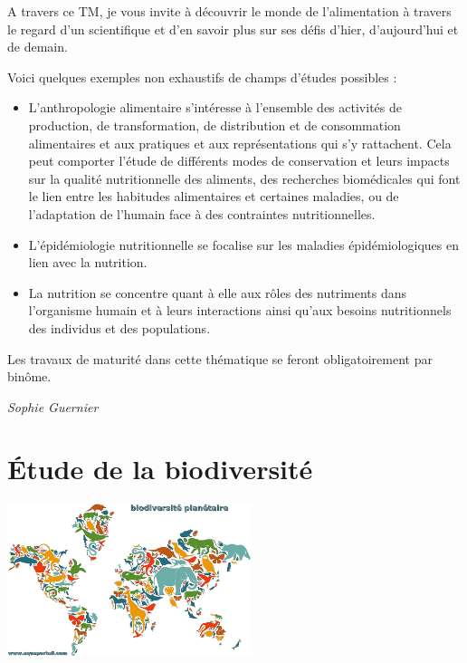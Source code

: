 \documentclass[
  10pt,
  french,
  a5paper,
  openany]{book}
\providecommand{\tightlist}{%
  \setlength{\itemsep}{0pt}\setlength{\parskip}{0pt}}
\newenvironment{signature}{\begin{flushright}}{\end{flushright}}
\begin{document}
A travers ce TM, je vous invite à découvrir le monde de l'alimentation à travers le regard d'un scientifique et d'en savoir plus sur ses défis d'hier, d'aujourd'hui et de demain. ~

Voici quelques exemples non exhaustifs de champs d'études possibles :

\begin{itemize}
\tightlist
\item
  L'anthropologie alimentaire s'intéresse à l'ensemble des activités de production, de transformation, de distribution et de consommation alimentaires et aux pratiques et aux représentations qui s'y rattachent. Cela peut comporter l'étude de différents modes de conservation et leurs impacts sur la qualité nutritionnelle des aliments, des recherches biomédicales qui font le lien entre les habitudes alimentaires et certaines maladies, ou de l'adaptation de l'humain face à des contraintes nutritionnelles.
\item
  L'épidémiologie nutritionnelle se focalise sur les maladies épidémiologiques en lien avec la nutrition.
\item
  La nutrition se concentre quant à elle aux rôles des nutriments dans l'organisme humain et à leurs interactions ainsi qu'aux besoins nutritionnels des individus et des populations.
\end{itemize}

Les travaux de maturité dans cette thématique se feront obligatoirement par binôme.

\begin{signature}
\emph{Sophie Guernier}

\end{signature}

\hypertarget{uxe9tude-de-la-biodiversituxe9}{%
\chapter{Étude de la biodiversité}\label{uxe9tude-de-la-biodiversituxe9}}

\begin{center}
\includegraphics[width=\textwidth,height=12em]{images/etude-de-la-biodiversite.png}

\end{center}
\end{document}

